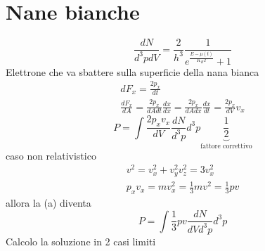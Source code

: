 \chapter{Nane bianche}

\begin{equation*}
    \frac{dN}{d^3pdV} = \frac{2}{h^3} \frac{1}{e^{\frac{E-\mu(t)}{K_BT}}+1}
\end{equation*}
Elettrone che va sbattere sulla superficie della nana bianca
\begin{gather*}
    dF_x = \frac{2p_x}{dt} \\
    \frac{dF_x}{dA} = \frac{2p_x}{dAdt}\frac{dx}{dx} = \frac{2p_x}{dAdx}\frac{dx}{dt} = \frac{2p_x}{dV}v_x
\end{gather*}
\begin{equation*}
    P = \int \frac{2p_xv_x}{dV} \frac{dN}{d^3p}d^3p \underbrace{\frac{1}{2}}_{\mbox{fattore correttivo}} \tag{a}
\end{equation*}
caso non relativistico
\begin{gather*}
    v^2 = v_x^2 + v^2_y v^2_z = 3v^2_x  \\
    p_xv_x = mv^2_x = \frac{1}{3}mv^2 = \frac{1}{3}pv   
\end{gather*}
allora la (a) diventa
\begin{equation*}
    P = \int \frac{1}{3}pv \frac{dN}{dVd^3p}d^3p
\end{equation*}
Calcolo la soluzione in 2 casi limiti

